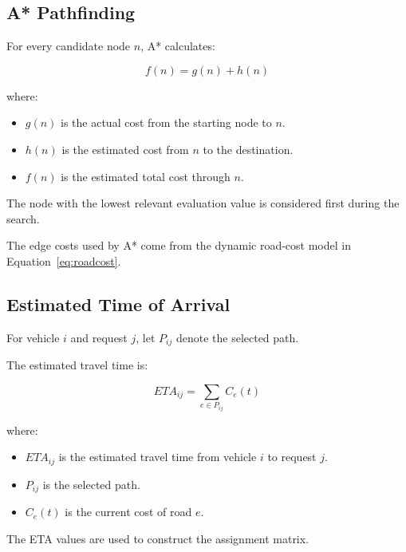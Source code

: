 \documentclass[12pt,a4paper]{article}
\begin{document}
\subsection{A* Pathfinding}

For every candidate node $n$, A* calculates:

\begin{equation}
    f(n)=g(n)+h(n)
    \label{eq:astar}
\end{equation}

where:

\begin{itemize}
    \item $g(n)$ is the actual cost from the starting node to $n$.
    \item $h(n)$ is the estimated cost from $n$ to the destination.
    \item $f(n)$ is the estimated total cost through $n$.
\end{itemize}

The node with the lowest relevant evaluation value is considered
first during the search.

The edge costs used by A* come from the dynamic road-cost model in
Equation~\eqref{eq:roadcost}.





\subsection{Estimated Time of Arrival}

For vehicle $i$ and request $j$, let $P_{ij}$ denote the selected
path.

The estimated travel time is:

\begin{equation}
    ETA_{ij}
    =
    \sum_{e\in P_{ij}} C_e(t)
    \label{eq:eta}
\end{equation}

where:

\begin{itemize}
    \item $ETA_{ij}$ is the estimated travel time from vehicle $i$
    to request $j$.
    \item $P_{ij}$ is the selected path.
    \item $C_e(t)$ is the current cost of road $e$.
\end{itemize}

The ETA values are used to construct the assignment matrix.
\end{document}
